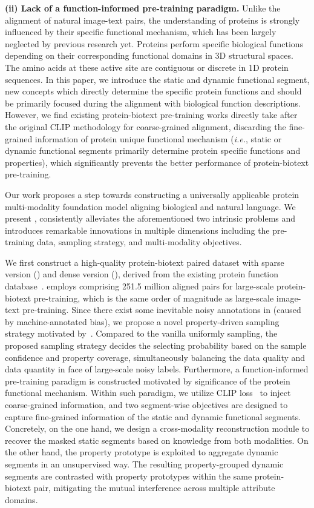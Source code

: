 \noindent \textbf{(ii) Lack of a function-informed pre-training paradigm.}
Unlike the alignment of natural image-text pairs, the understanding of proteins is strongly influenced by their specific functional mechanism, which has been largely neglected by previous research yet. Proteins perform specific biological functions depending on their corresponding functional domains in 3D structural spaces. The amino acids at these active site are contiguous or discrete in 1D protein sequences. In this paper, we introduce the static and dynamic functional segment, new concepts which directly determine the specific protein functions and should be primarily focused during the alignment with biological function descriptions. However, we find existing protein-biotext pre-training works directly take after the original CLIP methodology for coarse-grained alignment, discarding the fine-grained information of protein unique functional mechanism (\textit{i.e.}, static or dynamic functional segments primarily determine protein specific functions and properties), which significantly prevents the better performance of protein-biotext pre-training.

Our work proposes a step towards constructing a universally applicable protein multi-modality foundation model aligning biological and natural language. We present \ourapproach, consistently alleviates the aforementioned two intrinsic problems and introduces remarkable innovations in multiple dimensions including the pre-training data, sampling strategy, and multi-modality objectives.

We first construct a high-quality protein-biotext paired dataset \ourdataset with sparse version (\ourdatasetS) and dense version (\ourdatasetD), derived from the existing protein function database~\cite{UniProt}. 
\ourapproach employs \ourdatasetD comprising 251.5 million aligned pairs for large-scale protein-biotext pre-training, which is the same order of magnitude as large-scale image-text pre-training. 
Since there exist some inevitable noisy annotations in \ourdatasetD (caused by machine-annotated bias), we propose a novel property-driven sampling strategy motivated by~\cite{MixMatch, DivideMix}.
Compared to the vanilla uniformly sampling, the proposed sampling strategy decides the selecting probability based on the sample confidence and property coverage, simultaneously balancing the data quality and data quantity in face of large-scale noisy labels.
Furthermore, a function-informed pre-training paradigm is constructed motivated by significance of the protein functional mechanism. 
Within such paradigm, we utilize CLIP loss~\cite{clip} to inject coarse-grained information, and two segment-wise objectives are designed to capture fine-grained information of the static and dynamic functional segments.
Concretely, on the one hand, we design a cross-modality reconstruction module to recover the masked static segments based on knowledge from both modalities.
On the other hand, the property prototype is exploited to aggregate dynamic segments in an unsupervised way. The resulting property-grouped dynamic segments are contrasted with property prototypes within the same protein-biotext pair, mitigating the mutual interference across multiple attribute domains.

